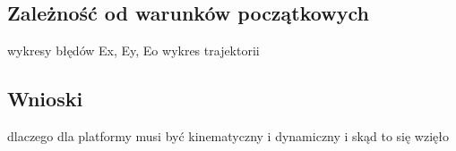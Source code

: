 \documentclass[12pt,a4paper]{article}
\begin{document}




    
  \subsection{Zależność od warunków początkowych}

  wykresy błędów Ex, Ey, Eo
  wykres trajektorii



  \subsection{Wnioski}
  dlaczego dla platformy musi być kinematyczny i dynamiczny i skąd to się wzięło

  
\end{document}
